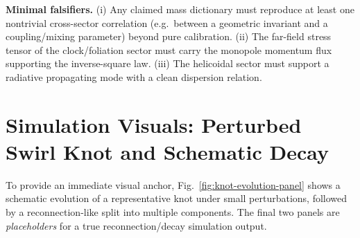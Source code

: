 \documentclass[10pt]{article}
\begin{document}
\medskip
\noindent\textbf{Minimal falsifiers.}
(i) Any claimed mass dictionary must reproduce at least one nontrivial cross-sector correlation
(e.g.\ between a geometric invariant and a coupling/mixing parameter) beyond pure calibration.
(ii) The far-field stress tensor of the clock/foliation sector must carry the monopole momentum flux
supporting the inverse-square law.
(iii) The helicoidal sector must support a radiative propagating mode with a clean dispersion relation.


\section{Simulation Visuals: Perturbed Swirl Knot and Schematic Decay}
\label{sec:v076-sim-visuals}

To provide an immediate visual anchor, Fig.~\ref{fig:knot-evolution-panel} shows a schematic evolution
of a representative knot under small perturbations, followed by a reconnection-like split into multiple
components. The final two panels are \emph{placeholders} for a true reconnection/decay simulation output.
\end{document}
